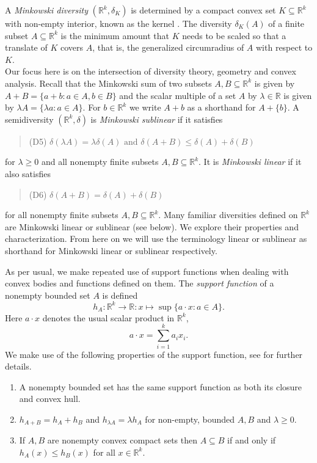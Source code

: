 \documentclass[11pt]{article}
\renewcommand{\Re}{\mathbb{R}}
\begin{document}
A {\em Minkowski diversity} $(\Re^k,\delta_K)$ is determined by a compact convex set $K \subseteq \Re^k$ with non-empty interior, known as the kernel \cite{bryant2023diversities}. The diversity $\delta_K(A)$ of a finite subset $A \subseteq \Re^k$ is the minimum amount that $K$ needs to be scaled so that a translate of $K$ covers $A$, that is, the generalized circumradius of $A$ with respect to $K$. \\



Our focus here is on the intersection of diversity theory, geometry and convex analysis. 
Recall that the Minkowski sum of two subsets $A, B \subseteq \Re^k$ is given by
\(
A+ B = \{ a + b : a \in A, b \in B\}
\)
and the scalar multiple of a set $A$ by $\lambda \in \Re$ is given by $\lambda A = \{ \lambda a : a \in A\}$.
For $b \in \Re^k$ we write  $A+b$ as a shorthand for $A + \{b\}$. A semidiversity $(\Re^k,\delta)$ is {\em Minkowski sublinear} if it satisfies 
\begin{quotation}
\noindent (D5) $\delta(\lambda A)  = \lambda \delta(A) \mbox{ and } \delta(A+B)  \leq \delta(A) + \delta(B)$
\end{quotation}
for $\lambda \geq  0$ and all nonempty finite subsets $A,B \subseteq \Re^k$. It is {\em Minkowski linear} if it also satisfies 
\begin{quotation}
\noindent (D6) $ \delta(A+B) = \delta(A) + \delta(B)$
\end{quotation}
for all nonempty finite subsets  $A,B \subseteq \Re^k$.
Many  familiar diversities defined on $\Re^k$ are Minkowski linear or sublinear (see below). We explore their properties and characterization. From here on we will use the terminology linear or sublinear as shorthand for Minkowski linear or sublinear respectively.


As per usual, we make repeated use of support functions when dealing with convex bodies and functions defined on them. The {\em support function}  of a nonempty bounded set $A$ is defined 
\[h_A:\Re^k \to \Re:x \mapsto \sup\{a\cdot x:a \in A\}.\]
Here $a \cdot x$ denotes  
the usual scalar product in $\Re^k$,
\[a \cdot x =\sum_{i=1}^k a_i x_i.\]
We make use of the following  properties of the support function, see \cite[Chapter 1]{Schneider14} for further details. 
    \begin{enumerate}
        \item A  nonempty bounded set has the same support function as both its closure and convex hull.
        \item $h_{A+B} = h_A + h_B$ and $h_{\lambda A} = \lambda h_A$ for non-empty, bounded $A,B$ and $\lambda \geq 0.$
        \item If $A,B$ are nonempty convex compact sets then $A \subseteq B$ if and only if $h_A(x) \leq h_B(x)$ for all $x \in \Re^k$.
     \end{enumerate}
\end{document}
